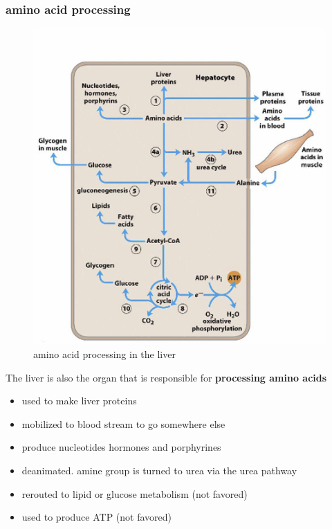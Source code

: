 \documentclass[../main.tex]{subfiles}
\begin{document}
\subsubsection{amino acid processing}
\begin{figure}[H]
    \centering
    \includegraphics[width=0.5\linewidth]{Sum_BC_II//lectures//bcll12/liverAminoAcid.png}
    \caption{amino acid processing in the liver}
    \label{fig:enter-label}
\end{figure}
The liver is also the organ that is responsible for \textbf{processing amino acids}
\begin{itemize}
    \item used to make liver proteins
    \item mobilized to blood stream to go somewhere else
    \item produce nucleotides hormones 
    and porphyrines 
    \item deanimated. amine group is turned to urea via the urea pathway
    \item rerouted to lipid or glucose metabolism (not favored)
    \item used to produce ATP (not favored)
\end{itemize}
\end{document}

